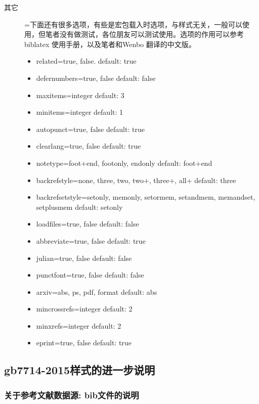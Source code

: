 \begin{description}
  \item[其它]=下面还有很多选项，有些是宏包载入时选项，与样式无关，一般可以使用，但笔者没有做测试，各位朋友可以测试使用。选项的作用可以参考biblatex 使用手册，以及笔者和Wenbo 翻译的中文版。
      \begin{itemize}
          \item related=true, false. default: true
          \item defernumbers=true, false default: false
          \item maxitems=integer default: 3
          \item minitems=integer default: 1
          \item autopunct=true, false default: true
          \item clearlang=true, false default: true
          \item notetype=foot+end, footonly, endonly default: foot+end
          \item backrefstyle=none, three, two, two+, three+, all+ default: three
          \item backrefsetstyle=setonly, memonly, setormem, setandmem, memandset, setplusmem default: setonly
          \item loadfiles=true, false default: false
          \item abbreviate=true, false default: true
          \item julian=true, false default: false
          \item punctfont=true, false default: false
          \item arxiv=abs, ps, pdf, format default: abs
          \item mincrossrefs=integer default: 2
          \item minxrefs=integer default: 2
          \item eprint=true, false default: true
      \end{itemize}

\end{description}


\subsection{gb7714-2015样式的进一步说明}

\subsubsection{关于参考文献数据源: bib文件的说明}\label{sec:bib:bibtex}

